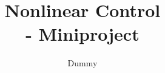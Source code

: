 


\title{\vspace{-2cm} Nonlinear Control \\ \Large - Miniproject}
\author{Dummy}


\maketitle








